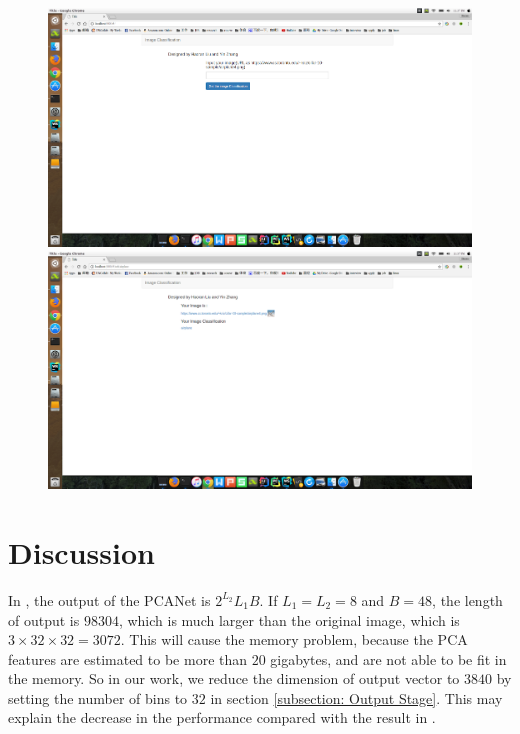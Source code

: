 \documentclass[10pt,twocolumn,letterpaper]{article}
\begin{document}
\begin{figure}
	\begin{center}
		\includegraphics[scale=1.7,width=18cm]{webpage1.png}
		\includegraphics[scale=1.7,width=18cm]{webpage2.png}
	\end{center}
	\caption{}\label{Fig: webpage}
\end{figure}


\section{Discussion}
In \cite{chan2015pcanet}, the output of the PCANet is $2^{L_2}L_1B$. If $L_1=L_2=8$ and $B=48$, the length of output is $98304$, which is much larger than the original image, which is $3\times 32 \times 32=3072$. This will cause the memory problem, because the PCA features are estimated to be more than $20$ gigabytes, and are not able to be fit in the memory. So in our work, we reduce the dimension of output vector to $3840$ by setting the number of bins to $32$ in section \ref{subsection: Output Stage}. This may explain the decrease in the performance compared with the result in \cite{chan2015pcanet}. 
\end{document}
